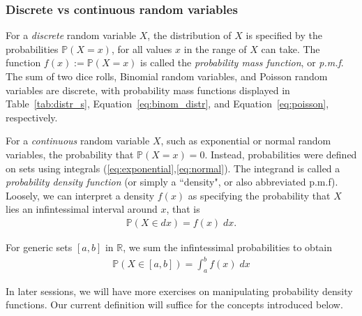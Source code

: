 \documentclass[11pt]{article}
\theoremstyle{definition}
\renewcommand{\P}{\mathbb{P}}
\newcommand{\R}{\mathbb{R}}
\begin{document}
\subsubsection*{Discrete vs continuous random variables}

For a \textit{discrete} random variable $X$, the distribution of $X$ is specified
by the probabilities $\P(X = x)$, for all values $x$ in the range of $X$
can take.
The function $f(x) := \P(X = x)$ is called the \textit{probability mass function}, or \textit{p.m.f}.
The sum of two dice rolls, Binomial random variables, and Poisson random variables
are discrete, with probability mass functions displayed in
Table~\ref{tab:distr_s}, Equation~\eqref{eq:binom_distr},
and Equation~\eqref{eq:poisson}, respectively.

For a \textit{continuous} random variable $X$, such as exponential or normal random variables,
the probability that $\P(X = x) = 0$. Instead, probabilities were defined on sets
using integrals (\ref{eq:exponential},\ref{eq:normal}).
The integrand is called a \textit{probability density function} (or simply a ``density", or also abbreviated p.m.f). Loosely,
we can interpret a density $f(x)$ as specifying the probability that $X$ lies
an infintessimal interval around $x$, that is
\begin{align*}
  \P(X \in dx) = f(x)\;dx.
\end{align*}

For generic sets $[a, b]$ in $\R$, we sum the infintessimal probabilities
to obtain
\begin{align*}
  \P(X\in[a, b]) = \int_a^b f(x)\;dx
\end{align*}

In later sessions, we will have more exercises on manipulating probability density functions.
Our current definition will suffice for the concepts introduced below.
\end{document}

